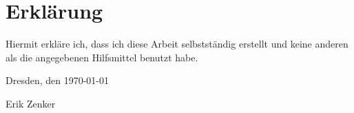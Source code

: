  

\section*{\vfill{} \thispagestyle{empty}
Erklärung}

Hiermit erkläre ich, dass ich diese Arbeit selbstständig erstellt
und keine anderen als die angegebenen Hilfsmittel benutzt habe.
\bigskip{}

\noindent Dresden, den \today %
\vspace{2.5cm}

\noindent Erik Zenker \cleardoublepage{}
